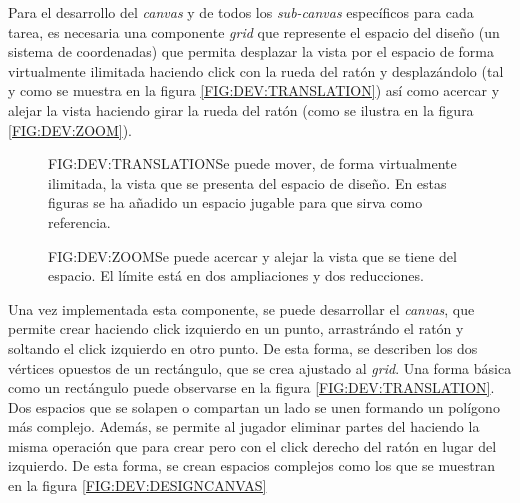 Para el desarrollo del \textit{canvas} y de todos los \textit{sub-canvas} específicos para cada tarea, es necesaria una componente \textit{grid} que represente el espacio del diseño (un sistema de coordenadas) que permita desplazar la vista por el espacio de forma virtualmente ilimitada haciendo click con la rueda del ratón y desplazándolo (tal y como se muestra en la figura \ref{FIG:DEV:TRANSLATION}) así como acercar y alejar la vista haciendo girar la rueda del ratón (como se ilustra en la figura \ref{FIG:DEV:ZOOM}).

\begin{figure}{FIG:DEV:TRANSLATION}{Se puede mover, de forma virtualmente ilimitada, la vista que se presenta del espacio de diseño. En estas figuras se ha añadido un espacio jugable para que sirva como referencia.}
	 \quad
\end{figure}

\begin{figure}{FIG:DEV:ZOOM}{Se puede acercar y alejar la vista que se tiene del espacio. El límite está en dos ampliaciones y dos reducciones.}
	 \quad
	 \quad
\end{figure}

Una vez implementada esta componente, se puede desarrollar el \textit{canvas}, que permite crear  haciendo click izquierdo en un punto, arrastrándo el ratón y soltando el click izquierdo en otro punto. De esta forma, se describen los dos vértices opuestos de un rectángulo, que se crea ajustado al \textit{grid}. Una forma básica como un rectángulo puede observarse en la figura \ref{FIG:DEV:TRANSLATION}. Dos espacios que se solapen o compartan un lado se unen formando un polígono más complejo.
Además, se permite al jugador eliminar partes del  haciendo la misma operación que para crear pero con el click derecho del ratón en lugar del izquierdo.
De esta forma, se crean espacios complejos como los que se muestran en la figura \ref{FIG:DEV:DESIGNCANVAS}

